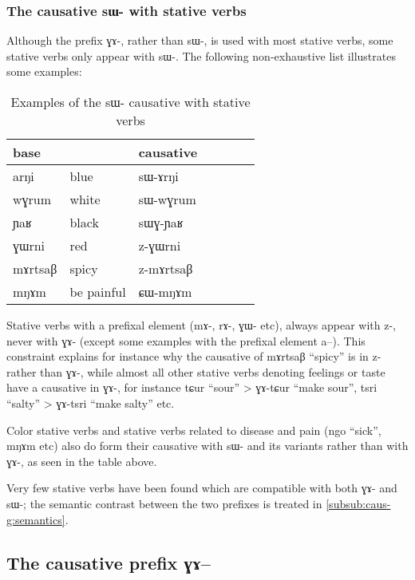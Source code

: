 \documentclass[oldfontcommands,oneside,a4paper,11pt]{article}
\newcommand{\ipa}[1]{{\phon \mbox{#1}}} %
\begin{document}
 \subsubsection{The causative \ipa{sɯ-} with stative verbs} \label{subsub:caus.sW.stative}
 Although the prefix \ipa{ɣɤ-}, rather than \ipa{sɯ-}, is used with most stative verbs, some stative verbs only appear with \ipa{sɯ-}. The following non-exhaustive list illustrates some examples:
 \begin{table}[H]
\caption{Examples of the \ipa{sɯ}- causative with stative verbs }\label{tab:causative.sW.stative} \centering
\begin{tabular}{lllllll} \toprule
  base  & &causative  \\
\midrule
   \ipa{arŋi} & blue & \ipa{sɯ-ɤrŋi} \\
 \ipa{wɣrum} & white & \ipa{sɯ-wɣrum} \\
 \ipa{ɲaʁ} & black & \ipa{sɯɣ-ɲaʁ} \\
  \ipa{ɣɯrni} & red & \ipa{z-ɣɯrni} \\
    \ipa{mɤrtsaβ} & spicy & \ipa{z-mɤrtsaβ} \\
       \ipa{mŋɤm} & be painful & \ipa{ɕɯ-mŋɤm} \\
\bottomrule
\end{tabular}
\end{table}
   
    Stative verbs with a prefixal element (\ipa{mɤ-}, \ipa{rɤ-}, \ipa{ɣɯ-} etc), always appear with \ipa{z-}, never with \ipa{ɣɤ-} (except some examples with the prefixal element \ipa{a--}). This constraint explains for instance why the causative of \ipa{mɤrtsaβ}  ``spicy'' is  in \ipa{z-} rather than \ipa{ɣɤ-}, while almost all other stative verbs denoting feelings or taste have a causative in \ipa{ɣɤ-}, for instance \ipa{tɕur}  ``sour'' > \ipa{ɣɤ-tɕur}  ``make   sour'',   \ipa{tsri}  ``salty'' > \ipa{ɣɤ-tsri}  ``make   salty'' etc.  
  
Color stative verbs and stative verbs related to disease and pain (\ipa{ngo} ``sick'', \ipa{mŋɤm} etc) also do  form their causative with \ipa{sɯ-} and its variants rather than with \ipa{ɣɤ-}, as seen in the table above.
  
  Very few stative verbs have been found which are compatible with both \ipa{ɣɤ-} and \ipa{sɯ-}; the semantic contrast between the two prefixes is treated in \ref{subsub:caus-g:semantics}.
 
 

\subsection{The causative prefix \ipa{ɣɤ--}} \label{sub:caus2}
\end{document}
